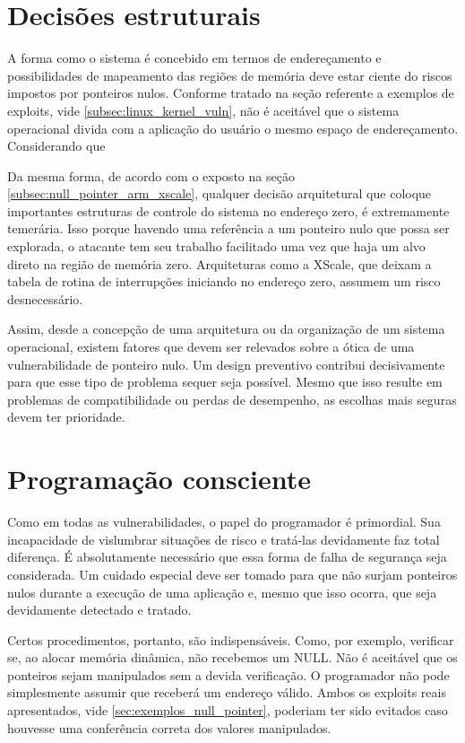 		\section{Decisões estruturais}		
			A forma como o sistema é concebido em termos de endereçamento e possibilidades de mapeamento
			das regiões de memória deve estar ciente do riscos impostos por ponteiros nulos.
			Conforme tratado na seção referente a exemplos de exploits, vide \ref{subsec:linux_kernel_vuln},
			não é aceitável que o sistema operacional divida com a aplicação do usuário o mesmo espaço
			de endereçamento. Considerando que

			
			Da mesma forma, de acordo com o exposto na seção \ref{subsec:null_pointer_arm_xscale}, 
			qualquer decisão arquitetural que coloque importantes estruturas de controle do sistema no 
			endereço zero, é extremamente temerária.
			Isso porque havendo uma referência a um ponteiro nulo que possa ser explorada, o atacante
			tem seu trabalho facilitado uma vez que haja um alvo direto na região de memória zero.
			Arquiteturas como a XScale, que deixam a tabela de rotina de interrupções iniciando no endereço zero,
			assumem um risco desnecessário.


			Assim, desde a concepção de uma arquitetura ou da organização de um sistema operacional,
			existem fatores que devem ser relevados sobre a ótica de uma vulnerabilidade de ponteiro nulo.
			Um design preventivo contribui decisivamente para que esse tipo de problema sequer seja possível.
			Mesmo que isso resulte em problemas de compatibilidade ou perdas de desempenho, as escolhas
			mais seguras devem ter prioridade.

		\section{Programação consciente}
			Como em todas as vulnerabilidades, o papel do programador é primordial.
			Sua incapacidade de vislumbrar situações de risco e tratá-las devidamente faz total diferença.
			É absolutamente necessário que essa forma de falha de segurança seja considerada.
			Um cuidado especial deve ser tomado para que não surjam ponteiros nulos
			durante a execução de uma aplicação e, mesmo que isso ocorra, que seja devidamente
			detectado e tratado.


			Certos procedimentos, portanto, são indispensáveis. Como, por exemplo, verificar se,
			ao alocar memória dinâmica, não recebemos um NULL. Não é aceitável que
			os ponteiros sejam manipulados sem a devida verificação. O programador não pode simplesmente
			assumir que receberá um endereço válido. Ambos os exploits reais apresentados, vide
			\ref{sec:exemplos_null_pointer}, poderiam ter sido evitados caso houvesse uma conferência correta
			dos valores manipulados.

